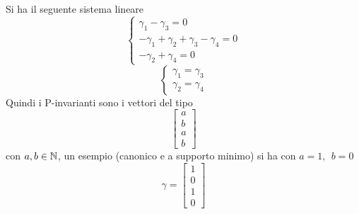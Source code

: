 \documentclass[10pt, letterpaper]{report}
\begin{document}
Si ha il seguente sistema lineare $$
\begin{cases}
    \gamma_1-\gamma_3=0\\ 
    -\gamma_1+\gamma_2+\gamma_3-\gamma_4=0\\ 
    -\gamma_2+\gamma_4=0
\end{cases}$$
$$
\begin{cases}
    \gamma_1=\gamma_3\\ 
    \gamma_2=\gamma_4
\end{cases}$$
Quindi i P-invarianti sono i vettori del tipo 
$$\begin{bmatrix}
    a \\ b \\ a \\b 
\end{bmatrix} $$
con $a,b\in{\mathbb N}$, un esempio (canonico e a supporto minimo) si ha con $a=1, \ \ b=0$
$$\gamma=\begin{bmatrix}
    1 \\ 0 \\ 1 \\0 
\end{bmatrix} $$
\end{document}
